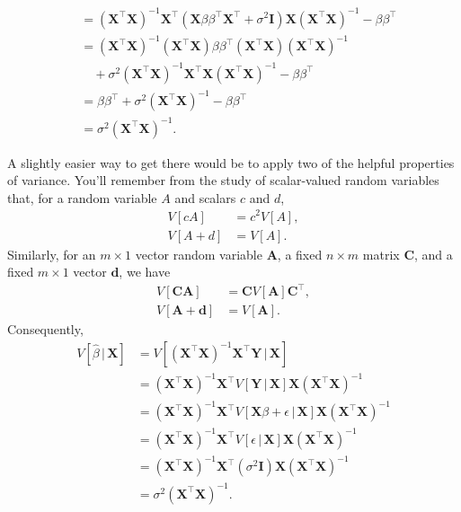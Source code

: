 \documentclass[12pt,oneside,openany]{book}
\begin{document}
\[\begin{aligned}
  &= (\mathbf{X}^\top \mathbf{X})^{-1} \mathbf{X}^\top ( \mathbf{X} \beta \beta^\top \mathbf{X}^\top + \sigma^2 \mathbf{I} ) \mathbf{X} (\mathbf{X}^\top \mathbf{X})^{-1} - \beta \beta^\top \\
  &= (\mathbf{X}^\top \mathbf{X})^{-1} (\mathbf{X}^\top \mathbf{X}) \beta \beta^\top (\mathbf{X}^\top \mathbf{X}) (\mathbf{X}^\top \mathbf{X})^{-1} \\ &\quad + \sigma^2 (\mathbf{X}^\top \mathbf{X})^{-1} \mathbf{X}^\top \mathbf{X} (\mathbf{X}^\top \mathbf{X})^{-1} - \beta \beta^\top \\
  &= \beta \beta^\top + \sigma^2 (\mathbf{X}^\top \mathbf{X})^{-1} - \beta \beta^\top \\
  &= \sigma^2 (\mathbf{X}^\top \mathbf{X})^{-1}.
\end{aligned}
\]

A slightly easier way to get there would be to apply two of the helpful
properties of variance. You'll remember from the study of scalar-valued
random variables that, for a random variable \(A\) and scalars \(c\) and
\(d\), \[
\begin{aligned}
  V[c A] &= c^2 V[A], \\
  V[A + d] &= V[A].
\end{aligned}
\] Similarly, for an \(m \times 1\) vector random variable
\(\mathbf{A}\), a fixed \(n \times m\) matrix \(\mathbf{C}\), and a
fixed \(m \times 1\) vector \(\mathbf{d}\), we have \[
\begin{aligned}
  V[\mathbf{C} \mathbf{A}] &= \mathbf{C} V[\mathbf{A}] \mathbf{C}^\top, \\
  V[\mathbf{A} + \mathbf{d}] &= V[\mathbf{A}].
\end{aligned}
\] Consequently, \[
\begin{aligned}
  V \left[ \hat{\beta} \,|\, \mathbf{X} \right]
  &= V[ (\mathbf{X}^\top \mathbf{X})^{-1} \mathbf{X}^\top \mathbf{Y} \,|\, \mathbf{X} ] \\
  &= (\mathbf{X}^\top \mathbf{X})^{-1} \mathbf{X}^\top V [\mathbf{Y} \,|\, \mathbf{X}] \mathbf{X} (\mathbf{X}^\top \mathbf{X})^{-1} \\
  &= (\mathbf{X}^\top \mathbf{X})^{-1} \mathbf{X}^\top V [\mathbf{X} \beta + \epsilon \,|\, \mathbf{X}] \mathbf{X} (\mathbf{X}^\top \mathbf{X})^{-1} \\
  &= (\mathbf{X}^\top \mathbf{X})^{-1} \mathbf{X}^\top V [\epsilon \,|\, \mathbf{X}] \mathbf{X} (\mathbf{X}^\top \mathbf{X})^{-1} \\
  &= (\mathbf{X}^\top \mathbf{X})^{-1} \mathbf{X}^\top (\sigma^2 \mathbf{I}) \mathbf{X} (\mathbf{X}^\top \mathbf{X})^{-1} \\
  &= \sigma^2 (\mathbf{X}^\top \mathbf{X})^{-1}.
\end{aligned}
\]
\end{document}
